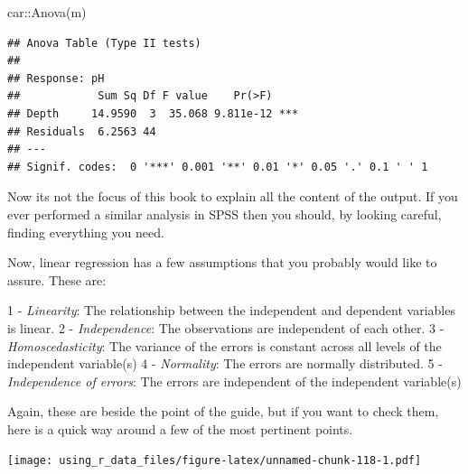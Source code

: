 \documentclass[
]{book}
\newenvironment{Shaded}{\begin{snugshade}}{\end{snugshade}}
\newcommand{\CommentTok}[1]{\textcolor[rgb]{0.56,0.35,0.01}{\textit{#1}}}
\newcommand{\DocumentationTok}[1]{\textcolor[rgb]{0.56,0.35,0.01}{\textbf{\textit{#1}}}}
\newcommand{\FunctionTok}[1]{\textcolor[rgb]{0.00,0.00,0.00}{#1}}
\newcommand{\NormalTok}[1]{#1}
\newcommand{\OtherTok}[1]{\textcolor[rgb]{0.56,0.35,0.01}{#1}}
\newcommand{\SpecialCharTok}[1]{\textcolor[rgb]{0.00,0.00,0.00}{#1}}
\begin{document}
\begin{Shaded}
\begin{Highlighting}[]
\NormalTok{car}\SpecialCharTok{::}\FunctionTok{Anova}\NormalTok{(m)}
\end{Highlighting}
\end{Shaded}

\begin{verbatim}
## Anova Table (Type II tests)
## 
## Response: pH
##            Sum Sq Df F value    Pr(>F)    
## Depth     14.9590  3  35.068 9.811e-12 ***
## Residuals  6.2563 44                      
## ---
## Signif. codes:  0 '***' 0.001 '**' 0.01 '*' 0.05 '.' 0.1 ' ' 1
\end{verbatim}

Now its not the focus of this book to explain all the content of the output. If you ever performed a similar analysis in SPSS then you should, by looking careful, finding everything you need.

Now, linear regression has a few assumptions that you probably would like to assure. These are:

1 - \emph{Linearity}: The relationship between the independent and dependent variables is linear.
2 - \emph{Independence}: The observations are independent of each other.
3 - \emph{Homoscedasticity}: The variance of the errors is constant across all levels of the independent variable(s)
4 - \emph{Normality}: The errors are normally distributed.
5 - \emph{Independence of errors}: The errors are independent of the independent variable(s)

Again, these are beside the point of the guide, but if you want to check them, here is a quick way around a few of the most pertinent points.

\begin{Shaded}
\end{Shaded}

\texttt{[image: using\_r\_data\_files/figure-latex/unnamed-chunk-118-1.pdf]}

\begin{Shaded}
\end{Shaded}
\end{document}
